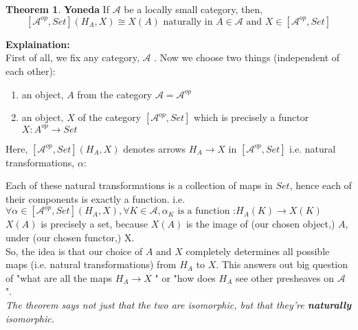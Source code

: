 \documentclass[18pt,a4paper]{extarticle}
\theoremstyle{definition}
\newtheorem{theorem}{Theorem}[section]
\theoremstyle{definition}
\begin{document}
\section{}
\begin{theorem}{\textbf{Yoneda}} %
	If $\mathcal{A} $ be a locally small category, then, \\
	\[ [ \mathcal{A} ^{op},Set ](H_A,X) \cong X(A) \text{ naturally in } A \in \mathcal{A} \text{ and }
	X \in [ \mathcal{A}^{op},Set]\]
\end{theorem}
\textbf{Explaination:} \\
First of all, we fix any category, $\mathcal{A} $ . Now we choose two things (independent of each other):
\begin{enumerate}[label=\roman*]
	\item an object, $A$ from the category $ \mathcal{A}= \mathcal{A} ^{op} $
	\item an object, $X$ of the category $[ \mathcal{A}^{op},Set] $
		which is precisely a functor $X: A^{op} \rightarrow Set$
\end{enumerate}
Here, $[ \mathcal{A}^{op},Set](	H_A,X) $ denotes arrows $H_A \rightarrow X$ in $[ \mathcal{A}^{op},Set] $
i.e. natural transformations, $\alpha :$
Each of these natural transformations is a collection of maps in $Set$, hence each of their
components is exactly a function. i.e.
$\forall \alpha \in [ \mathcal{A}^{op},Set](H_A,X), \forall K \in \mathcal{A}, \alpha_K \text{ is a function :} H_A(K) \to X(K)$\\

$X(A)$ is precisely a set, because $X(A)$ is the image of (our chosen object,) $A$, under (our chosen functor,) X. \\

So, the idea is that our choice of $A \text{ and } X$ completely determines all possible maps
(i.e. natural transformations) from $H_A \text{ to } X$. This answers out big question of "what are all the maps
$H_A  \rightarrow X$ " or "how does $H_A$ see other presheaves on $\mathcal{A} $ ".\\

\textit{The theorem says not just that the two are isomorphic, but that they're \textbf{naturally} isomorphic.}
\end{document}
